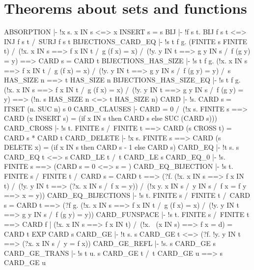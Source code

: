 \section{Theorems about sets and functions}
\THEOREM ABSORPTION
  |- !x s. x IN s <=> x INSERT s = s
\ENDTHEOREM
\THEOREM BIJ
  |- !f s t. BIJ f s t <=> INJ f s t /\ SURJ f s t
\ENDTHEOREM
\THEOREM BIJECTIONS\_CARD\_EQ
  |- !s t f g.
         (FINITE s \/ FINITE t) /\
         (!x. x IN s ==> f x IN t /\ g (f x) = x) /\
         (!y. y IN t ==> g y IN s /\ f (g y) = y)
         ==> CARD s = CARD t
\ENDTHEOREM
\THEOREM BIJECTIONS\_HAS\_SIZE
  |- !s t f g.
         (!x. x IN s ==> f x IN t /\ g (f x) = x) /\
         (!y. y IN t ==> g y IN s /\ f (g y) = y) /\
         s HAS_SIZE n
         ==> t HAS_SIZE n
\ENDTHEOREM
\THEOREM BIJECTIONS\_HAS\_SIZE\_EQ
  |- !s t f g.
         (!x. x IN s ==> f x IN t /\ g (f x) = x) /\
         (!y. y IN t ==> g y IN s /\ f (g y) = y)
         ==> (!n. s HAS_SIZE n <=> t HAS_SIZE n)
\ENDTHEOREM
\THEOREM CARD
  |- !s. CARD s = ITSET (\x n. SUC n) s 0
\ENDTHEOREM
\THEOREM CARD\_CLAUSES
  |- CARD {} = 0 /\
     (!x s.
          FINITE s
          ==> CARD (x INSERT s) = (if x IN s then CARD s else SUC (CARD s)))
\ENDTHEOREM
\THEOREM CARD\_CROSS
  |- !s t. FINITE s /\ FINITE t ==> CARD (s CROSS t) = CARD s * CARD t
\ENDTHEOREM
\THEOREM CARD\_DELETE
  |- !x s.
         FINITE s
         ==> CARD (s DELETE x) = (if x IN s then CARD s - 1 else CARD s)
\ENDTHEOREM
\THEOREM CARD\_EQ
  |- !t s. s CARD_EQ t <=> s CARD_LE t /\ t CARD_LE s
\ENDTHEOREM
\THEOREM CARD\_EQ\_0
  |- !s. FINITE s ==> (CARD s = 0 <=> s = {})
\ENDTHEOREM
\THEOREM CARD\_EQ\_BIJECTION
  |- !s t.
         FINITE s /\ FINITE t /\ CARD s = CARD t
         ==> (?f. (!x. x IN s ==> f x IN t) /\
                  (!y. y IN t ==> (?x. x IN s /\ f x = y)) /\
                  (!x y. x IN s /\ y IN s /\ f x = f y ==> x = y))
\ENDTHEOREM
\THEOREM CARD\_EQ\_BIJECTIONS
  |- !s t.
         FINITE s /\ FINITE t /\ CARD s = CARD t
         ==> (?f g.
                  (!x. x IN s ==> f x IN t /\ g (f x) = x) /\
                  (!y. y IN t ==> g y IN s /\ f (g y) = y))
\ENDTHEOREM
\THEOREM CARD\_FUNSPACE
  |- !s t.
         FINITE s /\ FINITE t
         ==> CARD
             {f | (!x. x IN s ==> f x IN t) /\ (!x. ~(x IN s) ==> f x = d)} =
             CARD t EXP CARD s
\ENDTHEOREM
\THEOREM CARD\_GE
  |- !t s. s CARD_GE t <=> (?f. !y. y IN t ==> (?x. x IN s /\ y = f x))
\ENDTHEOREM
\THEOREM CARD\_GE\_REFL
  |- !s. s CARD_GE s
\ENDTHEOREM
\THEOREM CARD\_GE\_TRANS
  |- !s t u. s CARD_GE t /\ t CARD_GE u ==> s CARD_GE u
\ENDTHEOREM
